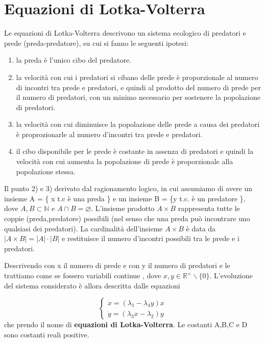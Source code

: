 \newpage

\section{Equazioni di Lotka-Volterra}
Le equazioni di Lotka-Volterra descrivono un sistema ecologico di predatori e prede (preda-predatore), su cui si fanno le seguenti ipotesi:
\begin{enumerate}
	\item la preda \`{e} l'unico cibo del predatore.
	\item la velocit\`{a} con cui i predatori si cibano delle prede \`{e} proporzionale al numero di incontri tra prede e predatori, e quindi al prodotto del numero di prede per il numero di predatori, con un minimo necessario per sostenere la popolazione di predatori.
	\item la velocit\`{a} con cui diminuisce la popolazione delle prede a causa dei predatori \`{e} proprozionarle al numero d'incontri tra prede e predatori.
	\item il cibo disponibile per le prede \`{e} costante in assenza di predatori e quindi la velocit\`{a} con cui aumenta la popolazione di prede \`{e} proporzionale alla popolazione stessa.
\end{enumerate}

\begin{remark}
Il punto 2) e 3) derivato dal ragionamento logico, in cui assumiamo di avere un insieme A = \{ x t.c \`{e} una preda \}  e un insieme B = \{y t.c. \`{e} un predatore \}, dove $A,B \subset \mathbb{N}$ e $A \cap B = \varnothing$. L'insieme prodotto $A \times B$ rappresenta tutte le coppie (preda,predatore) possibili (nel senso che una preda pu\`{o} incontrare uno qualsiasi dei predatori). La cardinalit\`{a} dell'insieme $A \times B $ \`{e} data da $|A \times B | = |A|\cdot|B|$ e restituisce il numero d'incontri possibili tra le prede e i predatori.	
\end{remark}

\noindent Descrivendo con x il numero di prede  e con y il numero di predatori e le trattiamo come se fossero variabili continue , dove $x,y \in \mathbb{R}^{+} \backslash \{0\}$. L'evoluzione del sistema considerato \`{e} allora descritta dalle equazioni

\begin{equation}
	\left \{ \begin{array}{l}
		\dot{x} = (\lambda_1 - \lambda_4y)x \\
		\dot{y} = (\lambda_3x - \lambda_2)y
	\end{array} \right. 
\end{equation}
che prendo il nome di \textbf{equazioni di Lotka-Volterra}. Le costanti A,B,C e D sono costanti reali positive.
\newpage

